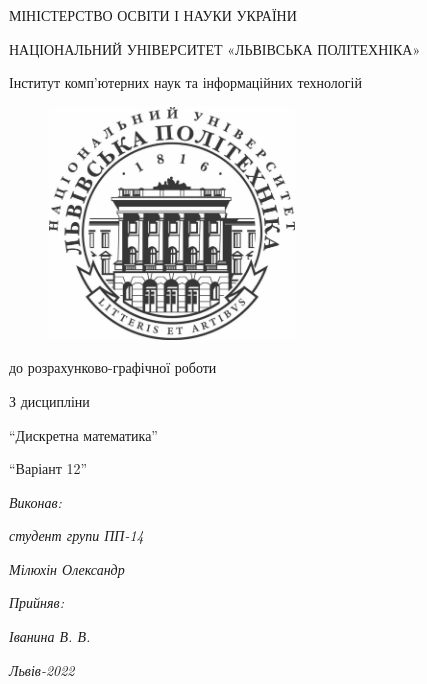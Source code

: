 \begin{titlepage}
\begin{center}

	{\fontsize{14}{24}\selectfont МІНІСТЕРСТВО ОСВІТИ І НАУКИ УКРАЇНИ

	НАЦІОНАЛЬНИЙ УНІВЕРСИТЕТ «ЛЬВІВСЬКА ПОЛІТЕХНІКА»

	Інститут комп'ютерних наук та інформаційних технологій

	}

	\vspace{60.4pt} %
	\begin{figure}[h]
		\centering
		\includegraphics[width=6.5cm,keepaspectratio]{../../lpnu.png}
	\end{figure}

	{\fontsize{18}{29}\selectfont{Звіт}

	{до розрахунково-графічної роботи}

	{З дисципліни}

	{``Дискретна математика''}

	{``Варіант 12''}

	}
\end{center}

\vspace{12.1pt} %
	{\fontsize{14}{22.4}\selectfont
\begin{flushright}
	\textit{Виконав:}

	\textit{студент групи ПП-14}

	\textit{Мілюхін Олександр}

	\textit{Прийняв:}

	\textit{Іванина В. В.}
\end{flushright}
\vspace{37.4pt} %
\begin{center}
\textit{Львів-2022}
\vspace{37.4pt} %
\end{center}
	}

\end{titlepage}
